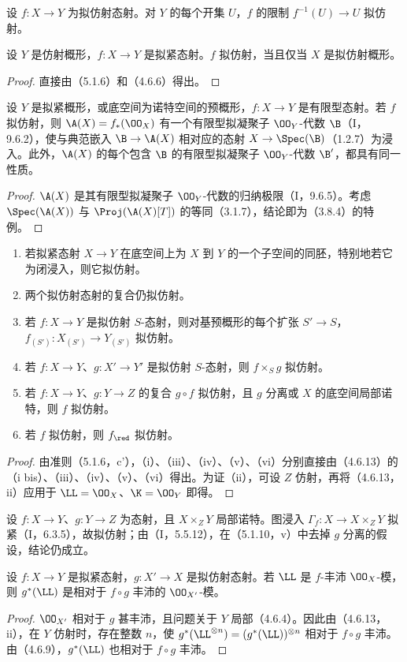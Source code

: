 设 $f:X\to Y$ 为拟仿射态射。对 $Y$ 的每个开集 $U$，$f$ 的限制 $f^{-1}(U)\to U$ 拟仿射。

设 $Y$ 是仿射概形，$f:X\to Y$ 是拟紧态射。$f$ 拟仿射，当且仅当 $X$ 是拟仿射概形。
\begin{proof}
直接由（5.1.6）和（4.6.6）得出。
\end{proof}

设 $Y$ 是拟紧概形，或底空间为诺特空间的预概形，$f:X\to Y$ 是有限型态射。若 $f$ 拟仿射，则 $\A(X)=f_*(\OO_X)$ 有一个有限型拟凝聚子 $\OO_Y$-代数 $\B$（I，9.6.2），使与典范嵌入 $\B\to\A(X)$ 相对应的态射 $X\to\Spec(\B)$（1.2.7）为浸入。此外，$\A(X)$ 的每个包含 $\B$ 的有限型拟凝聚子 $\OO_Y$-代数 $\B'$，都具有同一性质。
\begin{proof}
$\A(X)$ 是其有限型拟凝聚子 $\OO_Y$-代数的归纳极限（I，9.6.5）。考虑 $\Spec(\A(X))$ 与 $\Proj(\A(X)[T])$ 的等同（3.1.7），结论即为（3.8.4）的特例。
\end{proof}

\begin{enumerate}[label=\textup{(\roman*)}]
\item 若拟紧态射 $X\to Y$ 在底空间上为 $X$ 到 $Y$ 的一个子空间的同胚，特别地若它为闭浸入，则它拟仿射。
\item 两个拟仿射态射的复合仍拟仿射。
\item 若 $f:X\to Y$ 是拟仿射 $S$-态射，则对基预概形的每个扩张 $S'\to S$，$f_{(S')}:X_{(S')}\to Y_{(S')}$ 拟仿射。
\item 若 $f:X\to Y$、$g:X'\to Y'$ 是拟仿射 $S$-态射，则 $f\times_Sg$ 拟仿射。
\item 若 $f:X\to Y$、$g:Y\to Z$ 的复合 $g\circ f$ 拟仿射，且 $g$ 分离或 $X$ 的底空间局部诺特，则 $f$ 拟仿射。
\item 若 $f$ 拟仿射，则 $f_{\red}$ 拟仿射。
\end{enumerate}
\begin{proof}
由准则（5.1.6，c'），（i）、（iii）、（iv）、（v）、（vi）分别直接由（4.6.13）的（i bis）、（iii）、（iv）、（v）、（vi）得出。为证（ii），可设 $Z$ 仿射，再将（4.6.13，ii）应用于 $\LL=\OO_X$、$\K=\OO_Y$ 即得。
\end{proof}

设 $f:X\to Y$、$g:Y\to Z$ 为态射，且 $X\times_ZY$ 局部诺特。图浸入 $\Gamma_f:X\to X\times_ZY$ 拟紧（I，6.3.5），故拟仿射；由（I，5.5.12），在（5.1.10，v）中去掉 $g$ 分离的假设，结论仍成立。

设 $f:X\to Y$ 是拟紧态射，$g:X'\to X$ 是拟仿射态射。若 $\LL$ 是 $f$-丰沛 $\OO_X$-模，则 $g^*(\LL)$ 是相对于 $f\circ g$ 丰沛的 $\OO_{X'}$-模。
\begin{proof}
$\OO_{X'}$ 相对于 $g$ 甚丰沛，且问题关于 $Y$ 局部（4.6.4）。因此由（4.6.13，ii），在 $Y$ 仿射时，存在整数 $n$，使
$g^*(\LL^{\otimes n})=(g^*(\LL))^{\otimes n}$ 相对于 $f\circ g$ 丰沛。由（4.6.9），$g^*(\LL)$ 也相对于 $f\circ g$ 丰沛。
\end{proof}

